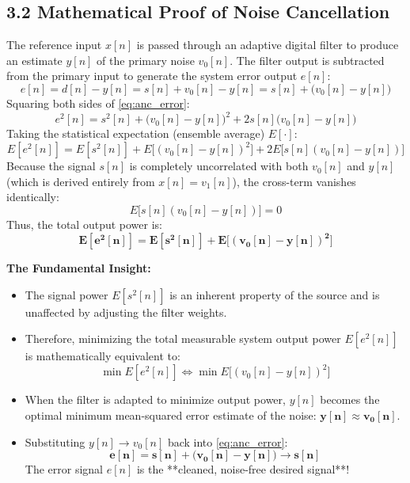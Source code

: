 \documentclass[11pt,a4paper]{article}
\begin{document}
\subsection{3.2 Mathematical Proof of Noise Cancellation}
The reference input $x[n]$ is passed through an adaptive digital filter to produce an estimate $y[n]$ of the primary noise $v_0[n]$. The filter output is subtracted from the primary input to generate the system error output $e[n]$:
\begin{equation}
e[n] = d[n] - y[n] = s[n] + v_0[n] - y[n] = s[n] + \big(v_0[n] - y[n]\big)
\label{eq:anc_error}
\end{equation}
Squaring both sides of \eqref{eq:anc_error}:
\begin{equation}
e^2[n] = s^2[n] + \big(v_0[n] - y[n]\big)^2 + 2 s[n]\big(v_0[n] - y[n]\big)
\end{equation}
Taking the statistical expectation (ensemble average) $E[\cdot]$:
\begin{equation}
E[e^2[n]] = E[s^2[n]] + E\big[(v_0[n] - y[n])^2\big] + 2 E\big[s[n](v_0[n] - y[n])\big]
\end{equation}
Because the signal $s[n]$ is completely uncorrelated with both $v_0[n]$ and $y[n]$ (which is derived entirely from $x[n] = v_1[n]$), the cross-term vanishes identically:
\begin{equation}
E\big[s[n](v_0[n] - y[n])\big] = 0
\end{equation}
Thus, the total output power is:
\begin{equation}
\mathbf{E[e^2[n]] = E[s^2[n]] + E\big[(v_0[n] - y[n])^2\big]}
\label{eq:power_split}
\end{equation}

\noindent\textbf{The Fundamental Insight:}
\begin{itemize}
    \item The signal power $E[s^2[n]]$ is an inherent property of the source and is unaffected by adjusting the filter weights.
    \item Therefore, minimizing the total measurable system output power $E[e^2[n]]$ is mathematically equivalent to:
    \begin{equation}
    \min E[e^2[n]] \iff \min E\big[(v_0[n] - y[n])^2\big]
    \end{equation}
    \item When the filter is adapted to minimize output power, $y[n]$ becomes the optimal minimum mean-squared error estimate of the noise: $\mathbf{y[n] \approx v_0[n]}$.
    \item Substituting $y[n] \to v_0[n]$ back into \eqref{eq:anc_error}:
    \begin{equation}
    \mathbf{e[n] = s[n] + \big(v_0[n] - y[n]\big) \longrightarrow s[n]}
    \end{equation}
    The error signal $e[n]$ is the **cleaned, noise-free desired signal**!
\end{itemize}
\end{document}
